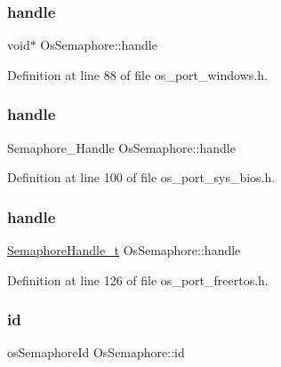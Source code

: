 \subsubsection{\texorpdfstring{handle}{handle}\hspace{0.1cm}{\footnotesize\ttfamily [1/3]}}
{\footnotesize\ttfamily void$\ast$ Os\+Semaphore\+::handle}



Definition at line 88 of file os\+\_\+port\+\_\+windows.\+h.

\mbox{\label{structOsSemaphore_ab28922c09a3089d95d8cb7f617177ff5}} 
\subsubsection{\texorpdfstring{handle}{handle}\hspace{0.1cm}{\footnotesize\ttfamily [2/3]}}
{\footnotesize\ttfamily Semaphore\+\_\+\+Handle Os\+Semaphore\+::handle}



Definition at line 100 of file os\+\_\+port\+\_\+sys\+\_\+bios.\+h.

\mbox{\label{structOsSemaphore_ae3a5702fa22ee14f97091aab20d8ecaf}} 
\subsubsection{\texorpdfstring{handle}{handle}\hspace{0.1cm}{\footnotesize\ttfamily [3/3]}}
{\footnotesize\ttfamily \hyperlink{semphr_8h_ad88c6df4a04beedeac782918c8a332f5}{Semaphore\+Handle\+\_\+t} Os\+Semaphore\+::handle}



Definition at line 126 of file os\+\_\+port\+\_\+freertos.\+h.

\mbox{\label{structOsSemaphore_a524627618a2b124f35e450b4ba708098}} 
\subsubsection{\texorpdfstring{id}{id}\hspace{0.1cm}{\footnotesize\ttfamily [1/2]}}
{\footnotesize\ttfamily os\+Semaphore\+Id Os\+Semaphore\+::id}



